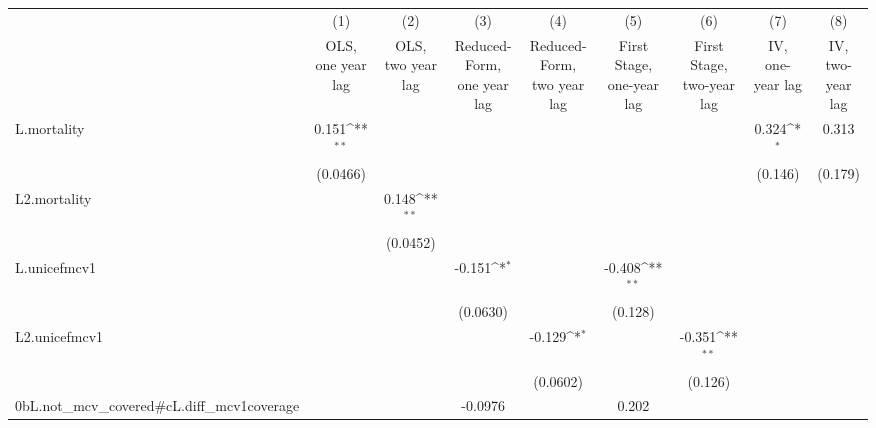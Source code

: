 {
\def\sym#1{\ifmmode^{#1}\else\(^{#1}\)\fi}
\begin{tabular}{l*{8}{c}}
\hline\hline
          &\multicolumn{1}{c}{(1)}&\multicolumn{1}{c}{(2)}&\multicolumn{1}{c}{(3)}&\multicolumn{1}{c}{(4)}&\multicolumn{1}{c}{(5)}&\multicolumn{1}{c}{(6)}&\multicolumn{1}{c}{(7)}&\multicolumn{1}{c}{(8)}\\
          &\multicolumn{1}{c}{OLS, one year lag}&\multicolumn{1}{c}{OLS, two year lag}&\multicolumn{1}{c}{Reduced-Form, one year lag}&\multicolumn{1}{c}{Reduced-Form, two year lag}&\multicolumn{1}{c}{First Stage, one-year lag}&\multicolumn{1}{c}{First Stage, two-year lag}&\multicolumn{1}{c}{IV, one-year lag}&\multicolumn{1}{c}{IV, two-year lag}\\
\hline
L.mortality&    0.151\sym{**} &                  &                  &                  &                  &                  &    0.324\sym{*}  &    0.313         \\
          & (0.0466)         &                  &                  &                  &                  &                  &  (0.146)         &  (0.179)         \\
[1em]
L2.mortality&                  &    0.148\sym{**} &                  &                  &                  &                  &                  &                  \\
          &                  & (0.0452)         &                  &                  &                  &                  &                  &                  \\
[1em]
L.unicefmcv1&                  &                  &   -0.151\sym{*}  &                  &   -0.408\sym{**} &                  &                  &                  \\
          &                  &                  & (0.0630)         &                  &  (0.128)         &                  &                  &                  \\
[1em]
L2.unicefmcv1&                  &                  &                  &   -0.129\sym{*}  &                  &   -0.351\sym{**} &                  &                  \\
          &                  &                  &                  & (0.0602)         &                  &  (0.126)         &                  &                  \\
[1em]
0bL.not\_mcv\_covered#cL.diff\_mcv1coverage&                  &                  &  -0.0976         &                  &    0.202         &                  &                  &                  \\

\end{tabular}}
